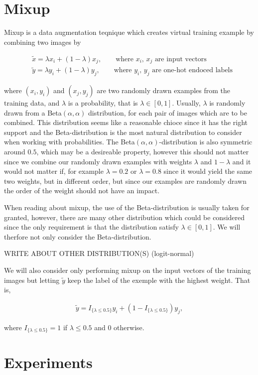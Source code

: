 \documentclass{article}
\begin{document}
\section{Mixup}

Mixup is a data augmentation teqnique which creates virtual training example by combining two images by 

\begin{align*}
 &\tilde{x} = \lambda x_i + (1-\lambda) x_j, \qquad \text{where $x_i$, $x_j$ are input vectors} \\
 &\tilde{y} = \lambda y_i + (1-\lambda) y_j, \qquad \text{where $y_i$, $y_j$ are one-hot endoced labels}
\end{align*}


where $(x_i, y_i)$ and $(x_j, y_j)$ are two randomly drawn examples from the training data, and $\lambda$ 
is a probability, that is $\lambda \in [0,1]$. Usually, $\lambda$ is randomly drawn from a Beta$(\alpha, \alpha)$ 
distribution, for each pair of images which are to be combined. This distribution seems like a 
reasonable chioce since it has the right support and the Beta-distribution is the most natural distribution to
consider when working with probabilities. The Beta$(\alpha, \alpha)$-distribution is also symmetric around $0.5$, which may be 
a desireable property, however this should not matter since we combine our randomly drawn examples with weights $\lambda$ and $1-\lambda$ and 
it would not matter if, for example $\lambda = 0.2$ or $\lambda = 0.8$ since it would yield the same two weights, but in different order, but 
since our examples are randomly drawn the order of the weight should not have an impact. 

When reading about mixup, the use of the Beta-distribution is usually taken for granted, however, there are many other distribution which 
could be considered since the only requirement is that the distribution satisfy $\lambda \in [0,1]$. We will therfore not only consider the 
Beta-distribution. 

WRITE ABOUT OTHER DISTRIBUTION(S) (logit-normal)

We will also consider only performing mixup on the input vectors of the training images but letting $\tilde{y}$ keep the label of the exemple 
with the highest weight. That is,

\begin{align*}
 \tilde{y} = I_{\{ \lambda \leq 0.5 \}} y_i + (1-I_{\{ \lambda \leq 0.5 \}}) y_j, 
\end{align*}

where $I_{\{ \lambda \leq 0.5 \}} = 1$ if $\lambda \leq 0.5$ and $0$ otherwise.

\section{Experiments}
\end{document}
